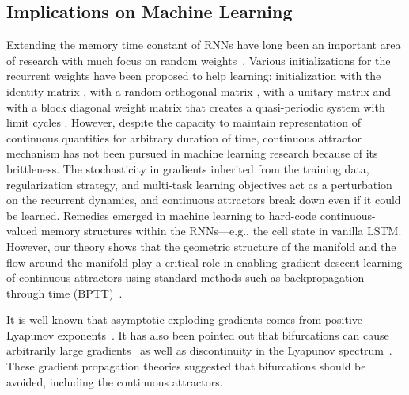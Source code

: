 \documentclass{article} %
\newcounter{ct}
\theoremstyle{definition}
\theoremstyle{remark}
\renewcommand{\cite}{\citep}
\begin{document}
\subsection{Implications on Machine Learning}\label{sec:imp:ML}
Extending the memory time constant of RNNs have long been an important area of research with much focus on random weights~\cite{Legenstein2007,Goldman2009,Toyoizumi2011,Kerg2019,Chen2018,Henaff2016,Rusch2021,arjovsky2016}.
Various initializations for the recurrent weights have been proposed to help learning: initialization with the identity matrix \citep{le2015}, with a random orthogonal matrix \citep{saxe2014,Henaff2016}, with a unitary matrix \citep{arjovsky2016} and with a block diagonal weight matrix that creates a quasi-periodic system with limit cycles \citep{Sokol2019a}.
However, despite the capacity to maintain representation of continuous quantities for arbitrary duration of time, continuous attractor mechanism has not been pursued in machine learning research because of its brittleness.
The stochasticity in gradients inherited from the training data, regularization strategy, and multi-task learning objectives act as a perturbation on the recurrent dynamics, and continuous attractors break down even if it could be learned.
Remedies emerged in machine learning to hard-code continuous-valued memory structures within the RNNs---e.g., the cell state in vanilla LSTM.
However, our theory shows that the geometric structure of the manifold and the flow around the manifold play a critical role in enabling gradient descent learning of continuous attractors using standard methods such as backpropagation through time (BPTT)~\cite{Toomarian1991}. 

It is well known that asymptotic exploding gradients comes from positive Lyapunov exponents~\cite{Mikhaeil2022,Vogt2022,Engelken2023}.
It has also been pointed out that bifurcations can cause arbitrarily large gradients~\cite{doya1993} as well as discontinuity in the Lyapunov spectrum~\cite{Park2023a}.
These gradient propagation theories suggested that bifurcations should be avoided, including the continuous attractors.
\end{document}

